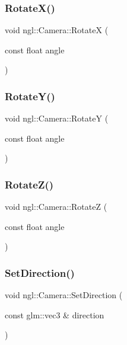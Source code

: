 \subsubsection{\texorpdfstring{Rotate\+X()}{RotateX()}}
{\footnotesize\ttfamily void ngl\+::\+Camera\+::\+RotateX (\begin{DoxyParamCaption}\item[{const float}]{angle }\end{DoxyParamCaption})}

\mbox{\label{classngl_1_1_camera_a4a0244f0332c97fdfdf088b242eb1518}} 
\subsubsection{\texorpdfstring{Rotate\+Y()}{RotateY()}}
{\footnotesize\ttfamily void ngl\+::\+Camera\+::\+RotateY (\begin{DoxyParamCaption}\item[{const float}]{angle }\end{DoxyParamCaption})}

\mbox{\label{classngl_1_1_camera_a4c75d13cd8e269f3fb28bc63903bd4cb}} 
\subsubsection{\texorpdfstring{Rotate\+Z()}{RotateZ()}}
{\footnotesize\ttfamily void ngl\+::\+Camera\+::\+RotateZ (\begin{DoxyParamCaption}\item[{const float}]{angle }\end{DoxyParamCaption})}

\mbox{\label{classngl_1_1_camera_a746b93c1e7c0a7fea5d7c4b2e2926c15}} 
\subsubsection{\texorpdfstring{Set\+Direction()}{SetDirection()}}
{\footnotesize\ttfamily void ngl\+::\+Camera\+::\+Set\+Direction (\begin{DoxyParamCaption}\item[{const glm\+::vec3 \&}]{direction }\end{DoxyParamCaption})}

